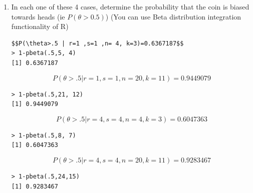 \documentclass[svgnames]{article}
\begin{document}
\begin{enumerate}[label = \alph*.]
\begin{lstlisting}
plot(c(1:1000)/1000,dbeta(c(1:1000)/1000,21, 12), col = 103, add = TRUE, xlab = 'Theta', ylab = 'Density', title('Theta Distribution r=1,s=1, n=20 k=11, Red = prior distribution') )
lines(c(1:1000)/1000,dbeta(c(1:1000)/1000,1, 1), col = 26,bg=405)

plot(c(1:1000)/1000,dbeta(c(1:1000)/1000,8, 7), col = 103, add = TRUE, xlab = 'Theta', ylab = 'Density', title('Theta Distribution r=4,s=4, n=4 k=3, Red = prior distribution    ') )
lines(c(1:1000)/1000,dbeta(c(1:1000)/1000,4, 4), col = 26,bg=405)


plot(c(1:1000)/1000,dbeta(c(1:1000)/1000,24, 15), col = 103, add = TRUE, xlab = 'Theta', ylab = 'Density', title('Theta Distribution r=4,s=4, n=20 k=11, Red = prior distribution       ') )
lines(c(1:1000)/1000,dbeta(c(1:1000)/1000,4, 4), col = 26,bg=405)
\end{lstlisting}

\item  In each one of these 4 cases, determine the probability that the coin is biased towards heads (ie $P(\theta>0.5)$) (You can use Beta distribution integration functionality of R)


\begin{lstlisting}
$$P(\theta>.5 | r=1 ,s=1 ,n= 4, k=3)=0.6367187$$
> 1-pbeta(.5,5, 4)
[1] 0.6367187
\end{lstlisting} 
$$P(\theta>.5 | r=1 ,s=1 ,n= 20, k=11)=0.9449079$$
\begin{lstlisting}
> 1-pbeta(.5,21, 12)
[1] 0.9449079
\end{lstlisting}
$$P(\theta>.5 | r=4 ,s=4, n= 4, k=3)=0.6047363$$
\begin{lstlisting}
> 1-pbeta(.5,8, 7)
[1] 0.6047363
\end{lstlisting} 
$$P(\theta>.5 | r=4 ,s=4, n= 20, k=11)=0.9283467$$
\begin{lstlisting}
> 1-pbeta(.5,24,15)
[1] 0.9283467
\end{lstlisting}
\end{enumerate}
\end{document}

